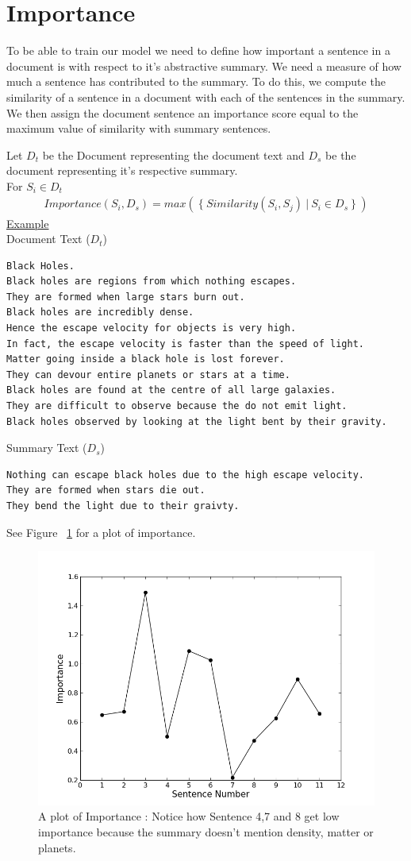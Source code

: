 \documentclass[BTech]{nitgoathesis}
\begin{document}
\section{Importance}
To be able to train our model we need to define how important a sentence in a document is with respect to it's abstractive summary. We need a measure of how much a sentence has contributed to the summary. To do this, we compute the similarity of a sentence in a document with each of the sentences in the summary. We then assign the document sentence an importance score equal to the maximum value of similarity with summary sentences.
\par
Let $D_t$ be the Document representing the document text and $D_s$ be the document representing it's respective summary.\\
For $S_i \in D_t$ 
\begin{align}
Importance(S_i,D_s) = max(\ \{\ Similarity(S_i,S_j)\ |\ S_i \in D_s\ \}\ )  
\end{align}
{\noindent \large \underline{Example}} \\
{Document Text ($D_t$)}
\begin{lstlisting}
Black Holes.
Black holes are regions from which nothing escapes.
They are formed when large stars burn out.
Black holes are incredibly dense.
Hence the escape velocity for objects is very high.
In fact, the escape velocity is faster than the speed of light.
Matter going inside a black hole is lost forever.
They can devour entire planets or stars at a time.
Black holes are found at the centre of all large galaxies.
They are difficult to observe because the do not emit light.
Black holes observed by looking at the light bent by their gravity.
\end{lstlisting}
 \vspace{1.2em}
{Summary Text ($D_s$)}
\begin{lstlisting}
Nothing can escape black holes due to the high escape velocity.
They are formed when stars die out.
They bend the light due to their graivty.
\end{lstlisting}
See Figure ~\ref{fig:importance} for a plot of importance.

\begin{figure}[h!]
  \centering
    \includegraphics[width=.8\textwidth]{images/importance}
    \caption{A plot of Importance : Notice how Sentence 4,7 and 8 get low importance because the summary doesn't mention density, matter or planets.}
    \label{fig:importance}
\end{figure}
\end{document}
